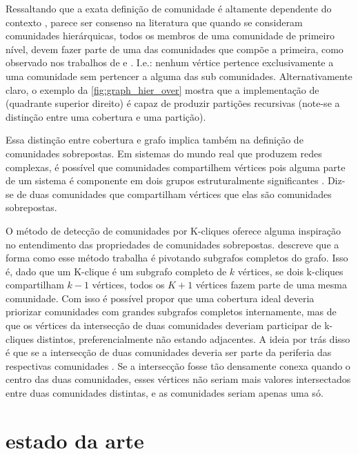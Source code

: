 \documentclass[notes.tex]{subfiles}
\begin{document}
Ressaltando que a exata definição de comunidade é altamente dependente do contexto \cite{fortunato2010community}, parece ser consenso na literatura que quando se consideram comunidades hierárquicas, todos os membros de uma comunidade de primeiro nível, devem fazer parte de uma das comunidades que compõe a primeira, como observado nos trabalhos de  e .
I.e.: nenhum vértice pertence exclusivamente a uma comunidade sem pertencer a alguma das sub comunidades.
Alternativamente claro, o exemplo da \autoref{fig:graph_hier_over} mostra que a implementação de  (quadrante superior direito) é capaz de produzir partições recursivas (note-se a distinção entre uma cobertura e uma partição).

Essa distinção entre cobertura e grafo implica também na definição de comunidades sobrepostas.
Em sistemas do mundo real que produzem redes complexas, é possível que comunidades compartilhem vértices pois alguma parte de um sistema é componente em dois grupos estruturalmente significantes \cite{shen2009detect}.
Diz-se de duas comunidades que compartilham vértices que elas são comunidades sobrepostas.

O método de detecção de comunidades por K-cliques oferece alguma inspiração no entendimento das propriedades de comunidades sobrepostas.
 descreve que a forma como esse método trabalha é pivotando subgrafos completos do grafo.
Isso é, dado que um K-clique é um subgrafo completo de $k$ vértices, se dois k-cliques compartilham  $k-1$ vértices, todos os $K+1$ vértices fazem parte de uma mesma comunidade.
Com isso é possível propor que uma cobertura ideal deveria priorizar comunidades com grandes subgrafos completos internamente, mas de que os vértices da intersecção de duas comunidades deveriam participar de k-cliques distintos, preferencialmente não estando adjacentes.
A ideia por trás disso é que se a intersecção de duas comunidades deveria ser parte da periferia das respectivas comunidades \cite{fortunato2010community}.
Se a intersecção fosse tão densamente conexa quando o centro das duas comunidades, esses vértices não seriam mais valores intersectados entre duas comunidades distintas, e as comunidades seriam apenas uma só.

\section{estado da arte}
\end{document}
